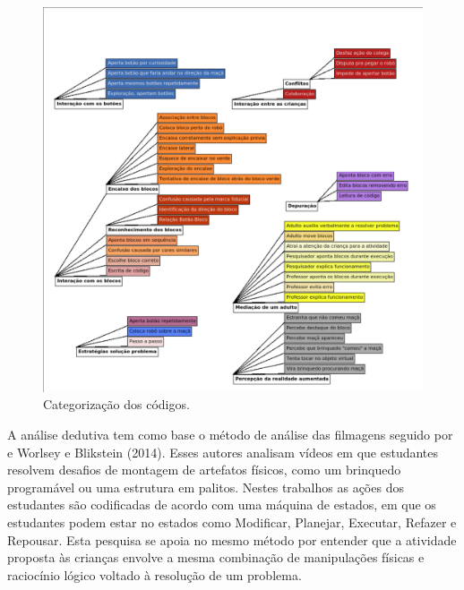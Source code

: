 \begin{figure}[!htpb]
    \centering
    \includegraphics[width=1\linewidth,fbox]{figs/categorias.png}
    \caption{Categorização dos códigos.}
    \sourceauthor
    \label{fig:codificacao}
\end{figure}

A análise dedutiva tem como base o método de análise das filmagens seguido por  e Worlsey e Blikstein (2014). Esses autores analisam vídeos em que estudantes resolvem desafios de montagem de artefatos físicos, como um brinquedo programável ou uma estrutura em palitos. Nestes trabalhos as ações dos estudantes são codificadas de acordo com uma máquina de estados, em que os estudantes podem estar no estados como Modificar, Planejar, Executar, Refazer e Repousar. Esta pesquisa se apoia no mesmo método por entender que a atividade proposta às crianças envolve a mesma combinação de manipulações físicas e raciocínio lógico voltado à resolução de um problema.


